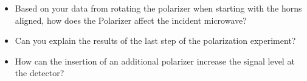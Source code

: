 \documentclass{article}
\begin{document}
\begin{itemize}

\item Based on your data from rotating the polarizer when starting with the horns aligned, how does the Polarizer affect the incident microwave?

\item Can you explain the results of the last step of the polarization experiment? 

\item How can the insertion of an additional polarizer increase the signal level at the detector?

\end{itemize}
\end{document}
